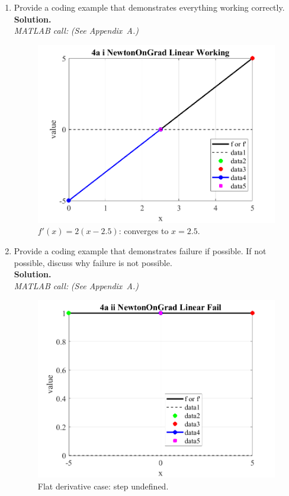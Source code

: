 \documentclass[11pt]{article}
\begin{document}
	\begin{enumerate}[label=4(\alph*)]
		
		\item Provide a coding example that demonstrates everything working correctly.\\
		\textbf{Solution.}\\
		\textit{MATLAB call:} \emph{(See Appendix~A.)}
		
		\begin{figure}[H]\centering
			\includegraphics[width=0.78\linewidth]{plots/4a_i_NewtonOnGrad_Linear_Working.png}
			\caption{$f'(x)=2(x-2.5)$: converges to \(x=2.5\).}
		\end{figure}
		
		\item Provide a coding example that demonstrates failure if possible. If not possible, discuss why failure is not possible.\\
		\textbf{Solution.}\\
		\textit{MATLAB call:} \emph{(See Appendix~A.)}
		
		\begin{figure}[H]\centering
			\includegraphics[width=0.78\linewidth]{plots/4a_ii_NewtonOnGrad_Linear_Fail.png}
			\caption{Flat derivative case: step undefined.}
		\end{figure}
		

\end{enumerate}
\end{document}
